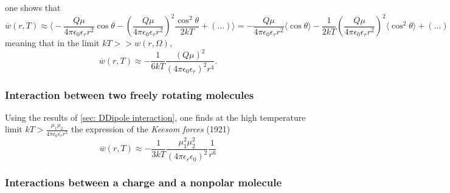 \documentclass[../phys-f308.tex]{subfiles}
\begin{document}
    one shows that
    \begin{equation}
        \overline{w}(r,T) \approx \Big\langle-\frac{Q\mu}{4\pi\epsilon_0\epsilon_r r^2}\cos\theta - \left(\frac{Q\mu}{4\pi\epsilon_0\epsilon_r r^2}\right)^2\frac{\cos^2\theta}{2kT} + (...)\Big\rangle = -\frac{Q\mu}{4\pi\epsilon_0\epsilon_r r^2}\big\langle\cos\theta\big\rangle - \frac{1}{2kT}\left(\frac{Q\mu}{4\pi\epsilon_0\epsilon_r r^2}\right)^2\Big\langle\cos^2\theta\Big\rangle + \left(...\right)
    \end{equation}
    meaning that in the limit $kT>>w(r,\Omega)$,
    \begin{equation}
        \overline{w}(r,T) \approx -\frac{1}{6kT}\frac{\left(Q\mu\right)^2}{\left(4\pi\epsilon_0\epsilon_r\right)^2r^4}.
    \end{equation}

    \subsubsection{Interaction between two freely rotating molecules}

    Using the results of \ref{sec: DDipole interaction}, one finds at the high temperature limit $kT>\frac{\mu_1\mu_2}{4\pi\epsilon_0\epsilon_r r^3}$ the expression of the \emph{Keesom forces} (1921)
    \begin{equation}
        \overline{w}(r,T)\approx -\frac{1}{3kT}\frac{\mu_1^2\mu_2^2}{\left(4\pi\epsilon_r\epsilon_0\right)^2}\frac{1}{r^6}\label{eq: Keesom forces}
    \end{equation}

    \subsubsection{Interactions between a charge and a nonpolar molecule}
\end{document}
